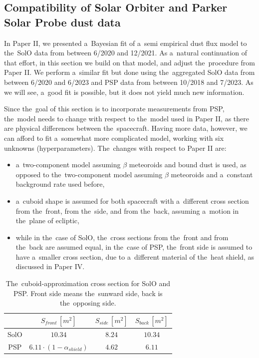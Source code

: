 \subsection{Compatibility of Solar Orbiter and Parker Solar Probe dust data}

In Paper II, we presented a~Bayesian fit of a~semi empirical dust flux model to the~SolO data from between 6/2020 and 12/2021. As a~natural continuation of that effort, in this section we build on that model, and adjust the~procedure from Paper II. We perform a~similar fit but done using the~aggregated SolO data from between 6/2020 and 6/2023 and PSP data from between 10/2018 and 7/2023. As we will see, a~good fit is possible, but it does not yield much new information. 

Since the~goal of this section is to incorporate measurements from PSP, the~model needs to change with respect to the~model used in Paper II, as there are physical differences between the~spacecraft. Having more data, however, we can afford to fit a~somewhat more complicated model, working with six unknowns (hyperparameters). The~changes with respect to Paper II are:
\begin{itemize}
    \item a~two-component model assuming $\beta$ meteoroids and bound dust is used, as opposed to the~two-component model assuming $\beta$ meteoroids and a~constant background rate used before,
    \item a~cuboid shape is assumed for both spacecraft with a~different cross section from the~front, from the~side, and from the~back, assuming a~motion in the~plane of ecliptic, 
    \item while in the~case of SolO, the~cross sections from the~front and from the~back are assumed equal, in the~case of PSP, the~front side is assumed to have a~smaller cross section, due to a~different material of the~heat shield, as discussed in Paper IV.
\end{itemize}

\begin{table}[t]
\caption{The~cuboid-approximation cross section for SolO and PSP. Front side means the~sunward side, back is the~opposing side.}
\centering
\label{tab:cross_section}
\begin{tabular}{c|ccc}
\multicolumn{1}{p{1.2cm}}{  } \vline &  
\multicolumn{1}{p{3cm}}{ \centering $S_{front} \, [m^2]$ } & 
\multicolumn{1}{p{2cm}}{ \centering $S_{side} \, [m^2]$} & 
\multicolumn{1}{p{2cm}}{ \centering $S_{back} \, [m^2]$} \\
\hline
SolO & $10.34$ & $8.24$ & $10.34$   \\
PSP & $6.11 \cdot (1-\alpha_{shield})$ & $4.62$ & $6.11$  \\
\hline
\end{tabular}
\end{table}

